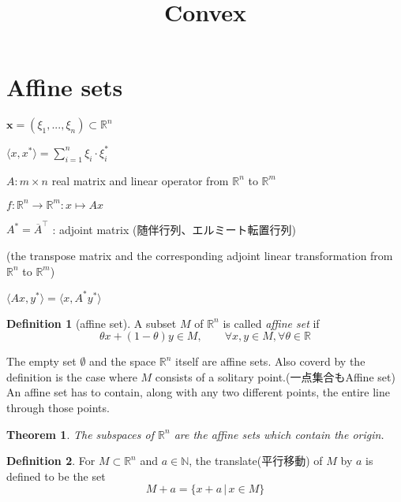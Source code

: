 \documentclass{jsarticle}
\newtheorem{thm}{Theorem}[section]
\theoremstyle{definition}
\newtheorem{dfn}{Definition}[section]
\begin{document}
\title{Convex}
\maketitle

\section{Affine sets}


$\bm{x} = (\xi_1,  ... , \xi_n) \subset \mathbb{R}^n$

$\langle x, x^*\rangle = \sum \limits_{i=1}^{n} \xi_i \cdot
\xi_i^* $

$A: m \times n$ real matrix and linear operator from
$\mathbb{R}^n$ to $\mathbb{R}^m$

\begin{math}
f: \mathbb{R}^n  \to \mathbb{R}^m   \colon x \mapsto Ax
\end{math}

\begin{math}
A^* = \overline{A}^\top
\end{math}
 : adjoint matrix (随伴行列、エルミート転置行列)
 
 (the transpose matrix and the corresponding adjoint linear transformation from
$\mathbb{R}^n$ to $\mathbb{R}^m$)

\begin{math}
\langle Ax, y^*\rangle =  \langle x, A^*y^*\rangle
\end{math}
\\



\begin{dfn}[affine set]
A subset $M$ of $\mathbb{R}^n $ is called \textit{affine set }
if
\[
\theta x + (1 - \theta )y \in M, \qquad \forall x, y \in M,
\forall \theta \in \mathbb{R}
\]
\end{dfn}


The empty set $\emptyset$ and the space $\mathbb{R}^n$ itself
are affine sets.
Also coverd by the definition is the case where $M$ consists of
a solitary point.(一点集合もAffine set)
An affine set has to contain, along with any two different
points, the entire line through those points.\\


\begin{thm} 
The subspaces of $\mathbb{R}^n$ are the affine sets which
contain the origin. 
\end{thm}



\begin{dfn}
For $M \subset \mathbb{R}^n$ and $a \in \mathbb{N}$, the
translate(平行移動) of $M$ by $a$ is defined to be the set
\[
M + a = \{x + a \,| \,   x \in M \}
\]
\end{dfn}
\end{document}

